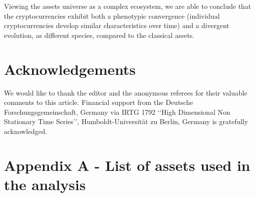 Viewing the assets universe as a complex ecosystem, we are able to conclude that the cryptocurrencies exhibit both a phenotypic convergence (individual cryptocurrencies develop similar characteristics over time) and a divergent evolution, as different species, compared to the classical assets.

\section*{Acknowledgements}
We would like to thank the editor and the anonymous referees for their valuable comments to this article. Financial support from the Deutsche Forschungsgemeinschaft, Germany via IRTG 1792 ‘‘High Dimensional Non Stationary Time Series’’, Humboldt-Universität zu Berlin, Germany is gratefully acknowledged.


\newcommand{\sectionbreak}{\clearpage}
\appendix
\section*{Appendix A - List of assets used in the analysis}\label{appendix:a}

